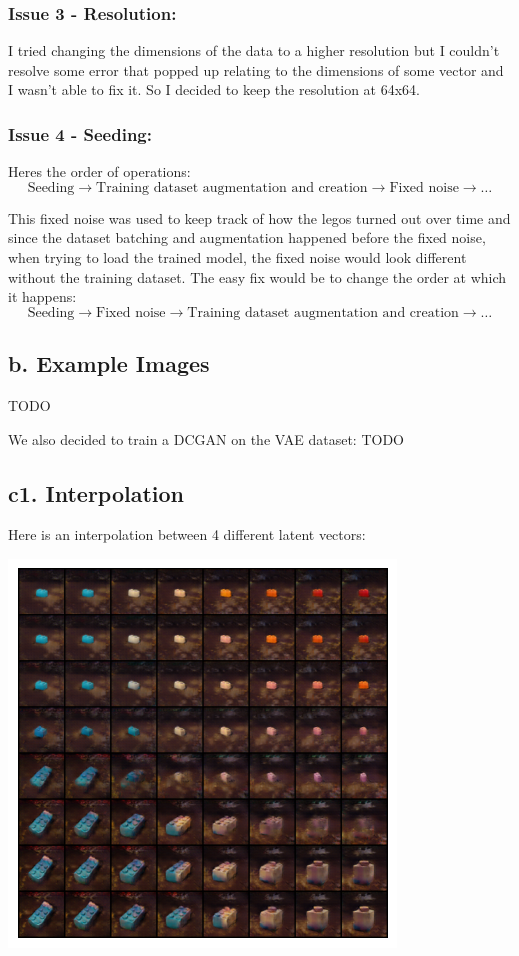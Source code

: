 \documentclass{article}
\begin{document}
\subsubsection*{Issue 3 - Resolution:}
I tried changing the dimensions of the data to a higher resolution but I couldn't resolve some error that popped up relating
to the dimensions of some vector and I wasn't able to fix it. So I decided to
keep the resolution at 64x64.

\subsubsection*{Issue 4 - Seeding:}
Heres the order of operations:
$$
\text{Seeding}
\rightarrow
\text{Training dataset augmentation and creation}
\rightarrow
\text{Fixed noise}
\rightarrow \dots
$$

\noindent This fixed noise was used to keep track of how the legos turned
out over time and since the dataset batching and augmentation happened before
the fixed noise, when trying to load the trained model, the fixed noise would look
different without the training dataset. The easy fix would be to change the order
at which it happens:
$$
\text{Seeding}
\rightarrow
\text{Fixed noise}
\rightarrow
\text{Training dataset augmentation and creation}
\rightarrow \dots
$$

\subsection*{b. Example Images}
TODO

We also decided to train a DCGAN on the VAE dataset:
TODO


\subsection*{c1. Interpolation}
Here is an interpolation between 4 different latent vectors:
\begin{center}
\includegraphics[scale=1]{./imgs/seed_69,0,23,42,62_interpolation}
\end{center}
\end{document}
